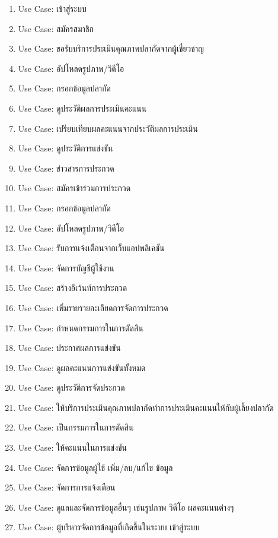 \begin{enumerate}
	\item Use Case: เข้าสู่ระบบ
	\item Use Case: สมัครสมาชิก
	\item Use Case: ขอรับบริการประเมินคุณภาพปลากัดจากผู้เชี่ยวชาญ
	\item Use Case: อัปโหลดรูปภาพ/วิดีโอ
	\item Use Case: กรอกข้อมูลปลากัด
	\item Use Case: ดูประวัติผลการประเมินคะแนน
	\item Use Case: เปรียบเทียบผลคะแนนจากประวัติผลการประเมิน
	\item Use Case: ดูประวัติการแข่งขัน
	\item Use Case: ข่าวสารการประกวด
	\item Use Case: สมัครเข้าร่วมการประกวด
	\item Use Case: กรอกข้อมูลปลากัด
	\item Use Case: อัปโหลดรูปภาพ/วิดีโอ
	\item Use Case: รับการแจ้งเตือนจากเว็บแอปพลิเคชัน
	\item Use Case: จัดการบัญชีผู้ใช้งาน
	\item Use Case: สร้างอีเว้นท์การประกวด
	\item Use Case: เพิ่มรายรายละเอียดการจัดการประกวด
	\item Use Case: กำหนดกรรมการในการตัดสิน
	\item Use Case: ประกาศผลการแข่งขัน
	\item Use Case: ดูผลคะแนนการแข่งขันทั้งหมด
	\item Use Case: ดูประวัติการจัดประกวด
	\item Use Case: ให้บริการประเมินคุณภาพปลากัดทำการประเมินคะแนนให้กับผู้เลี้ยงปลากัด
	\item Use Case: เป็นกรรมการในการตัดสิน
	\item Use Case: ให้คะแนนในการแข่งขัน
	\item Use Case: จัดการข้อมูลผู้ใช้ เพิ่ม/ลบ/แก้ไข ข้อมูล
	\item Use Case: จัดการการแจ้งเตือน
	\item Use Case: ดูแลและจัดการข้อมูลอื่นๆ เช่นรูปภาพ วิดีโอ ผลคะแนนต่างๆ
	\item Use Case: ผู้บริหารจัดการข้อมูลที่เกิดขึ้นในระบบ เข้าสู่ระบบ
\end{enumerate}

\vspace{\baselineskip}

